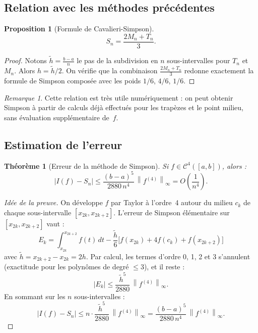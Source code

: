 \documentclass[a4paper,12pt]{article}
\theoremstyle{definition}
\theoremstyle{plain}
\newtheorem{theoreme}{Théorème}[section]
\newtheorem{proposition}{Proposition}[section]
\theoremstyle{remark}
\newtheorem{remarque}{Remarque}[section]
\newcommand{\abs}[1]{\left|#1\right|}
\newcommand{\norme}[1]{\left\|#1\right\|_\infty}
\begin{document}
\subsection{Relation avec les méthodes précédentes}

\begin{proposition}[Formule de Cavalieri-Simpson]
\[
  S_n = \frac{2M_n + T_n}{3}.
\]
\end{proposition}

\begin{proof}
Notons $\tilde{h} = \frac{b-a}{n}$ le pas de la subdivision en $n$ sous-intervalles pour $T_n$ et $M_n$. Alors $h = \tilde{h}/2$. On vérifie que la combinaison $\frac{2M_n + T_n}{3}$ redonne exactement la formule de Simpson composée avec les poids $1/6$, $4/6$, $1/6$.
\end{proof}

\begin{remarque}
Cette relation est très utile numériquement : on peut obtenir Simpson à partir de calculs déjà effectués pour les trapèzes et le point milieu, sans évaluation supplémentaire de~$f$.
\end{remarque}

\subsection{Estimation de l'erreur}

\begin{theoreme}[Erreur de la méthode de Simpson]\label{thm:erreur_simpson}
Si $f \in \mathcal{C}^4([a,b])$, alors :
\[
  \abs{I(f) - S_n} \leq \frac{(b-a)^5}{2880\,n^4}\,\norme{f^{(4)}} = O\!\left(\frac{1}{n^4}\right).
\]
\end{theoreme}

\begin{proof}[Idée de la preuve]
On développe $f$ par Taylor à l'ordre~4 autour du milieu $c_k$ de chaque sous-intervalle $[x_{2k}, x_{2k+2}]$. L'erreur de Simpson élémentaire sur $[x_{2k}, x_{2k+2}]$ vaut :
\[
  E_k = \int_{x_{2k}}^{x_{2k+2}} f(t)\,dt - \frac{\tilde{h}}{6}\big[f(x_{2k}) + 4f(c_k) + f(x_{2k+2})\big]
\]
avec $\tilde{h} = x_{2k+2} - x_{2k} = 2h$. Par calcul, les termes d'ordre 0, 1, 2 et 3 s'annulent (exactitude pour les polynômes de degré $\leq 3$), et il reste :
\[
  \abs{E_k} \leq \frac{\tilde{h}^5}{2880}\,\norme{f^{(4)}}.
\]
En sommant sur les $n$ sous-intervalles :
\[
  \abs{I(f) - S_n} \leq n \cdot \frac{\tilde{h}^5}{2880}\,\norme{f^{(4)}} = \frac{(b-a)^5}{2880\,n^4}\,\norme{f^{(4)}}.
\]
\end{proof}
\end{document}
